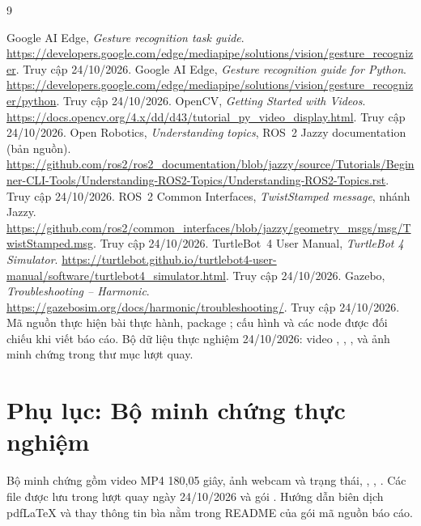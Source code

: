 \documentclass[12pt,a4paper]{article}
\begin{document}
\begin{thebibliography}{9}
 Google AI Edge, \emph{Gesture recognition task guide}. \url{https://developers.google.com/edge/mediapipe/solutions/vision/gesture_recognizer}. Truy cập 24/10/2026.
 Google AI Edge, \emph{Gesture recognition guide for Python}. \url{https://developers.google.com/edge/mediapipe/solutions/vision/gesture_recognizer/python}. Truy cập 24/10/2026.
 OpenCV, \emph{Getting Started with Videos}. \url{https://docs.opencv.org/4.x/dd/d43/tutorial_py_video_display.html}. Truy cập 24/10/2026.
 Open Robotics, \emph{Understanding topics}, ROS~2 Jazzy documentation (bản nguồn). \url{https://github.com/ros2/ros2_documentation/blob/jazzy/source/Tutorials/Beginner-CLI-Tools/Understanding-ROS2-Topics/Understanding-ROS2-Topics.rst}. Truy cập 24/10/2026.
 ROS~2 Common Interfaces, \emph{TwistStamped message}, nhánh Jazzy. \url{https://github.com/ros2/common_interfaces/blob/jazzy/geometry_msgs/msg/TwistStamped.msg}. Truy cập 24/10/2026.
 TurtleBot~4 User Manual, \emph{TurtleBot 4 Simulator}. \url{https://turtlebot.github.io/turtlebot4-user-manual/software/turtlebot4_simulator.html}. Truy cập 24/10/2026.
 Gazebo, \emph{Troubleshooting -- Harmonic}. \url{https://gazebosim.org/docs/harmonic/troubleshooting/}. Truy cập 24/10/2026.
 Mã nguồn thực hiện bài thực hành, package ; cấu hình  và các node được đối chiếu khi viết báo cáo.
 Bộ dữ liệu thực nghiệm 24/10/2026: video , , ,  và ảnh minh chứng trong thư mục lượt quay.
\end{thebibliography}

\appendix
\section*{Phụ lục: Bộ minh chứng thực nghiệm}
Bộ minh chứng gồm video MP4 180,05 giây, ảnh webcam và trạng thái, , , . Các file được lưu trong lượt quay ngày 24/10/2026 và gói . Hướng dẫn biên dịch pdfLaTeX và thay thông tin bìa nằm trong README của gói mã nguồn báo cáo.
\end{document}
